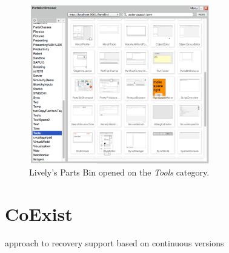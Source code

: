 \begin{figure}[h]
    \centering
    \includegraphics[width=0.7\textwidth]{figures/partsBin.pdf}
    \caption{Lively's Parts Bin opened on the \emph{Tools} category.}
    \label{fig:PartsBin}
\end{figure}

\section{CoExist}


approach to recovery support based on continuous versions




% 
% 
% 



